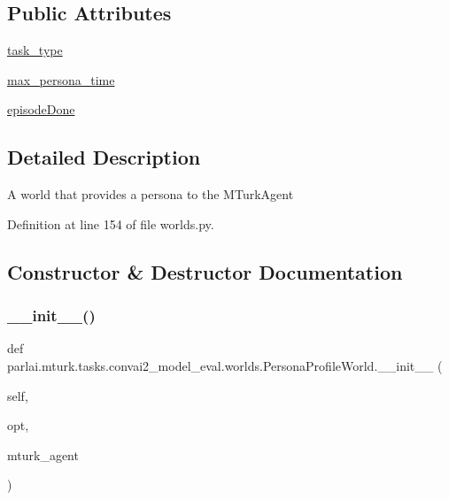 \subsection*{Public Attributes}
\begin{DoxyCompactItemize}
\item 
\hyperlink{classparlai_1_1mturk_1_1tasks_1_1convai2__model__eval_1_1worlds_1_1PersonaProfileWorld_af482933a082195bce55b2e1aa9acc655}{task\+\_\+type}
\item 
\hyperlink{classparlai_1_1mturk_1_1tasks_1_1convai2__model__eval_1_1worlds_1_1PersonaProfileWorld_a54ca0ba78081ea9c21830464fbefe989}{max\+\_\+persona\+\_\+time}
\item 
\hyperlink{classparlai_1_1mturk_1_1tasks_1_1convai2__model__eval_1_1worlds_1_1PersonaProfileWorld_aa2f2d6ce0bde9d360668fc44378b248b}{episode\+Done}
\end{DoxyCompactItemize}


\subsection{Detailed Description}
\begin{DoxyVerb}A world that provides a persona to the MTurkAgent\end{DoxyVerb}
 

Definition at line 154 of file worlds.\+py.



\subsection{Constructor \& Destructor Documentation}
\mbox{\label{classparlai_1_1mturk_1_1tasks_1_1convai2__model__eval_1_1worlds_1_1PersonaProfileWorld_ae78876910c6b8572ec62f825015167c1}} 
\subsubsection{\texorpdfstring{\+\_\+\+\_\+init\+\_\+\+\_\+()}{\_\_init\_\_()}}
{\footnotesize\ttfamily def parlai.\+mturk.\+tasks.\+convai2\+\_\+model\+\_\+eval.\+worlds.\+Persona\+Profile\+World.\+\_\+\+\_\+init\+\_\+\+\_\+ (\begin{DoxyParamCaption}\item[{}]{self,  }\item[{}]{opt,  }\item[{}]{mturk\+\_\+agent }\end{DoxyParamCaption})}



